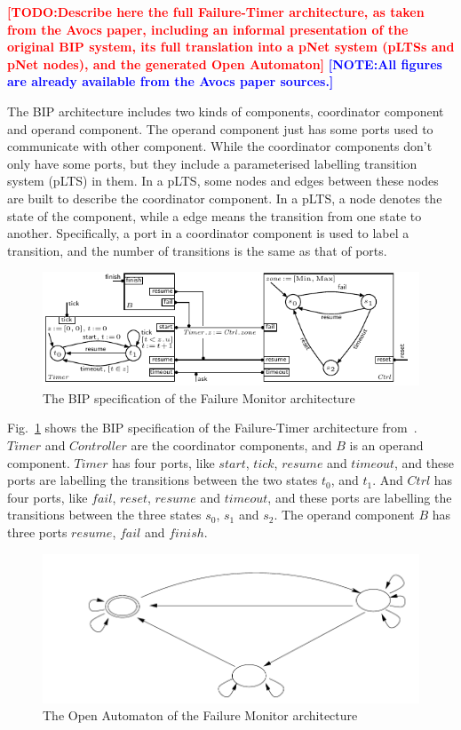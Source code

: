 \documentclass[runningheads,a4paper]{llncs}
\newcommand{\TODO}[1]{\textcolor{red}{\textbf{[TODO:#1]}}}
\newcommand{\NOTE}[1]{\textcolor{blue}{\textbf{[NOTE:#1]}}}
\begin{document}
\TODO{Describe here the full Failure-Timer architecture, as taken from the Avocs paper, including an informal presentation of the original BIP system, its full translation into a pNet system (pLTSs and pNet nodes), and the generated Open Automaton}
\NOTE{All figures are already available from the Avocs paper sources.}

The BIP architecture includes two kinds of components, coordinator component and operand component. The operand component just has some ports used to communicate with other component. While the coordinator components don't only have some ports, but they include a parameterised labelling transition system (pLTS) in them. In a pLTS, some nodes and edges between these nodes are built to describe the coordinator component. In a pLTS, a node denotes the state of the component, while a edge means the transition from one state to another. Specifically, a port in a coordinator component is used to label a transition, and the number of transitions is the same as that of ports. 


\begin{figure}[ht]
  \centering
  \includegraphics[width=0.8\columnwidth]{figures/BIPspec-ArchFailureTimerMax-v3.pdf}
  \caption{The BIP specification of the Failure Monitor architecture}
  \label{schema:ArchFailure:BIP}
\end{figure}

Fig.~\ref{schema:ArchFailure:BIP} shows the BIP specification of the Failure-Timer architecture from~\cite{xudong2017smt}.  $Timer$ and $Controller$ are the coordinator components, and $B$ is an operand component. $Timer$ has four ports, like $start$, $tick$, $resume$ and $timeout$, and these ports are labelling the transitions between the two states $t_{0}$, and $t_{1}$. And $Ctrl$ has four ports, like $fail$, $reset$, $resume$ and $timeout$, and these ports are labelling the transitions between the three states $s_{0}$, $s_{1}$ and $s_{2}$. The operand component $B$ has three ports $resume$, $fail$ and $finish$.


\begin{figure}[ht]
  \centering
  \includegraphics[width=0.8\columnwidth]{figures/FailureTimerOA.pdf}
  \caption{The Open Automaton of the Failure Monitor architecture}
  \label{schema:ArchFailure:OA}
\end{figure}
\end{document}
